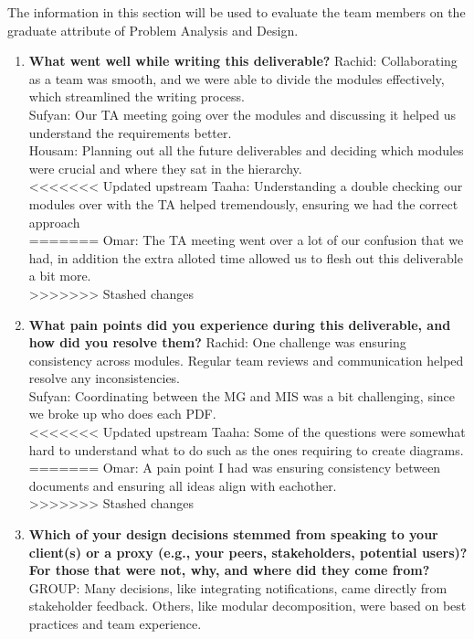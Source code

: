 \documentclass[12pt, titlepage]{article}
\begin{document}
The information in this section will be used to evaluate the team members on the
graduate attribute of Problem Analysis and Design.



\begin{enumerate}
  \item \textbf{What went well while writing this deliverable?}  
  \newline
  Rachid: Collaborating as a team was smooth, and we were able to divide the modules effectively, which streamlined the writing process. \\
  Sufyan: Our TA meeting going over the modules and discussing it helped us understand the requirements better. \\
  Housam: Planning out all the future deliverables and deciding which modules were crucial and where they sat in the hierarchy. \\
<<<<<<< Updated upstream
  Taaha: Understanding a double checking our modules over with the TA helped tremendously, ensuring we had the correct approach \\
=======
  Omar: The TA meeting went over a lot of our confusion that we had, in addition the extra alloted time allowed us to flesh out this deliverable a bit more. \\
>>>>>>> Stashed changes

  \item \textbf{What pain points did you experience during this deliverable, and how did you resolve them?}  
  \newline
  Rachid: One challenge was ensuring consistency across modules. Regular team reviews and communication helped resolve any inconsistencies. \\
  Sufyan: Coordinating between the MG and MIS was a bit challenging, since we broke up who does each PDF. \\
<<<<<<< Updated upstream
  Taaha: Some of the questions were somewhat hard to understand what to do such as the ones requiring to create diagrams. \\
=======
  Omar: A pain point I had was ensuring consistency between documents and ensuring all ideas align with eachother. \\
>>>>>>> Stashed changes

  \item \textbf{Which of your design decisions stemmed from speaking to your client(s) or a proxy (e.g., your peers, stakeholders, potential users)? For those that were not, why, and where did they come from?}  
  \newline
  GROUP: Many decisions, like integrating notifications, came directly from stakeholder feedback. Others, like modular decomposition, were based on best practices and team experience.


\end{enumerate}
\end{document}
